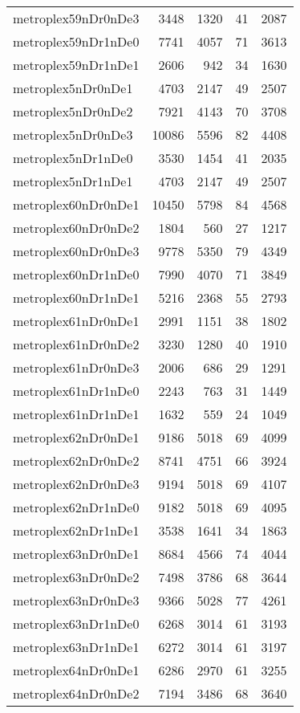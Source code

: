 \begin{longtable}{lrrrr}
metroplex59nDr0nDe3 & 3448 & 1320 & 41 & 2087 \\
metroplex59nDr1nDe0 & 7741 & 4057 & 71 & 3613 \\
metroplex59nDr1nDe1 & 2606 & 942 & 34 & 1630 \\
metroplex5nDr0nDe1 & 4703 & 2147 & 49 & 2507 \\
metroplex5nDr0nDe2 & 7921 & 4143 & 70 & 3708 \\
metroplex5nDr0nDe3 & 10086 & 5596 & 82 & 4408 \\
metroplex5nDr1nDe0 & 3530 & 1454 & 41 & 2035 \\
metroplex5nDr1nDe1 & 4703 & 2147 & 49 & 2507 \\
metroplex60nDr0nDe1 & 10450 & 5798 & 84 & 4568 \\
metroplex60nDr0nDe2 & 1804 & 560 & 27 & 1217 \\
metroplex60nDr0nDe3 & 9778 & 5350 & 79 & 4349 \\
metroplex60nDr1nDe0 & 7990 & 4070 & 71 & 3849 \\
metroplex60nDr1nDe1 & 5216 & 2368 & 55 & 2793 \\
metroplex61nDr0nDe1 & 2991 & 1151 & 38 & 1802 \\
metroplex61nDr0nDe2 & 3230 & 1280 & 40 & 1910 \\
metroplex61nDr0nDe3 & 2006 & 686 & 29 & 1291 \\
metroplex61nDr1nDe0 & 2243 & 763 & 31 & 1449 \\
metroplex61nDr1nDe1 & 1632 & 559 & 24 & 1049 \\
metroplex62nDr0nDe1 & 9186 & 5018 & 69 & 4099 \\
metroplex62nDr0nDe2 & 8741 & 4751 & 66 & 3924 \\
metroplex62nDr0nDe3 & 9194 & 5018 & 69 & 4107 \\
metroplex62nDr1nDe0 & 9182 & 5018 & 69 & 4095 \\
metroplex62nDr1nDe1 & 3538 & 1641 & 34 & 1863 \\
metroplex63nDr0nDe1 & 8684 & 4566 & 74 & 4044 \\
metroplex63nDr0nDe2 & 7498 & 3786 & 68 & 3644 \\
metroplex63nDr0nDe3 & 9366 & 5028 & 77 & 4261 \\
metroplex63nDr1nDe0 & 6268 & 3014 & 61 & 3193 \\
metroplex63nDr1nDe1 & 6272 & 3014 & 61 & 3197 \\
metroplex64nDr0nDe1 & 6286 & 2970 & 61 & 3255 \\
metroplex64nDr0nDe2 & 7194 & 3486 & 68 & 3640 \\

\end{longtable}
